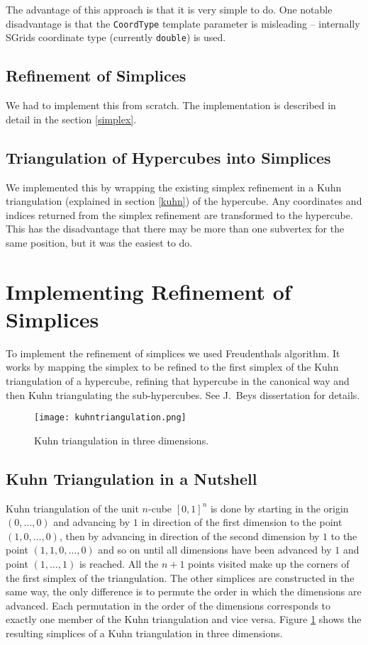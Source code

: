 \documentclass[english,a4paper]{article}
\newcommand{\code}[1]{\textnormal{\lstinline{#1}}}
\begin{document}
The advantage of this approach is that it is very simple to do.  One
notable disadvantage is that the \code{CoordType} template parameter is
misleading -- internally SGrids coordinate type (currently
\code{double}) is used.

\subsection{Refinement of Simplices}

We had to implement this from scratch.  The implementation is
described in detail in the section \ref{simplex}.

\subsection{Triangulation of Hypercubes into Simplices}

We implemented this by wrapping the existing simplex refinement in a
Kuhn triangulation (explained in section \ref{kuhn}) of the hypercube.
Any coordinates and indices returned from the simplex refinement are
transformed to the hypercube.  This has the disadvantage that there
may be more than one subvertex for the same position, but it was the
easiest to do.

\section{\label{simplex}Implementing Refinement of Simplices}

To implement the refinement of simplices we used Freudenthals
algorithm.  It works by mapping the simplex to be refined to the first
simplex of the Kuhn triangulation of a hypercube, refining that
hypercube in the canonical way and then Kuhn triangulating the
sub-hypercubes. See J.~Beys dissertation\cite{jbey} for details.

\begin{figure}
  \centering
  \texttt{[image: kuhntriangulation.png]}
  \caption{\label{kuhntria}Kuhn triangulation in three dimensions.}
\end{figure}

\subsection{\label{kuhn}Kuhn Triangulation in a Nutshell}

Kuhn triangulation of the unit $n$-cube $[0, 1]^n$ is done by starting
in the origin $(0, \ldots, 0)$ and advancing by $1$ in direction of
the first dimension to the point $(1, 0, \ldots, 0)$, then by
advancing in direction of the second dimension by $1$ to the point
$(1, 1, 0, \ldots, 0)$ and so on until all dimensions have been
advanced by $1$ and point $(1, \ldots, 1)$ is reached.  All the $n+1$
points visited make up the corners of the first simplex of the
triangulation.  The other simplices are constructed in the same way,
the only difference is to permute the order in which the dimensions
are advanced.  Each permutation in the order of the dimensions
corresponds to exactly one member of the Kuhn triangulation and vice
versa.  Figure \ref{kuhntria} shows the resulting simplices of a Kuhn
triangulation in three dimensions.
\end{document}
